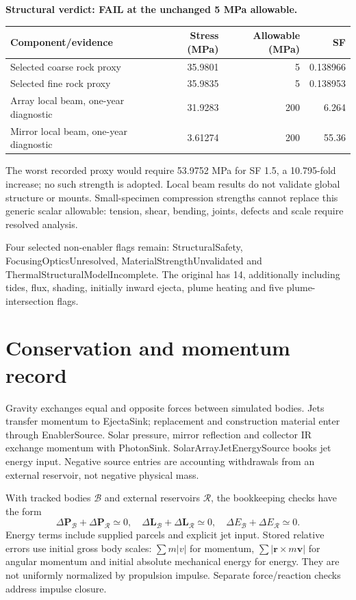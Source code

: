 ﻿\documentclass[10pt,a4paper]{article}
\begin{document}
\textbf{Structural verdict: FAIL at the unchanged 5 MPa allowable.}
\par\smallskip
{\small\noindent\begin{tabularx}{\linewidth}{@{}Xrrr@{}}\toprule
Component/evidence & Stress (MPa) & Allowable (MPa) & SF\\\midrule
Selected coarse rock proxy & 35.9801 & 5 & 0.138966\\
Selected fine rock proxy & 35.9835 & 5 & 0.138953\\
Array local beam, one-year diagnostic & 31.9283 & 200 & 6.264\\
Mirror local beam, one-year diagnostic & 3.61274 & 200 & 55.36\\\bottomrule
\end{tabularx}\par}
\smallskip

The worst recorded proxy would require 53.9752 MPa for SF 1.5, a 10.795-fold increase; no such strength is adopted. Local beam results do not validate global structure or mounts. Small-specimen compression strengths cannot replace this generic scalar allowable: tension, shear, bending, joints, defects and scale require resolved analysis.

Four selected non-enabler flags remain: StructuralSafety, FocusingOpticsUnresolved, MaterialStrengthUnvalidated and ThermalStructuralModelIncomplete. The original has 14, additionally including tides, flux, shading, initially inward ejecta, plume heating and five plume-intersection flags.
\newpage
\section{Conservation and momentum record}
Gravity exchanges equal and opposite forces between simulated bodies. Jets transfer momentum to EjectaSink; replacement and construction material enter through EnablerSource. Solar pressure, mirror reflection and collector IR exchange momentum with PhotonSink. SolarArrayJetEnergySource books jet energy input. Negative source entries are accounting withdrawals from an external reservoir, not negative physical mass.

With tracked bodies $\mathcal B$ and external reservoirs $\mathcal R$, the bookkeeping checks have the form
\[
\Delta\mathbf P_{\mathcal B}+\Delta\mathbf P_{\mathcal R}\simeq0,\quad
\Delta\mathbf L_{\mathcal B}+\Delta\mathbf L_{\mathcal R}\simeq0,\quad
\Delta E_{\mathcal B}+\Delta E_{\mathcal R}\simeq0.
\]
Energy terms include supplied parcels and explicit jet input. Stored relative errors use initial gross body scales: $\sum m|v|$ for momentum, $\sum|\mathbf r\times m\mathbf v|$ for angular momentum and initial absolute mechanical energy for energy. They are not uniformly normalized by propulsion impulse. Separate force/reaction checks address impulse closure.
\end{document}
